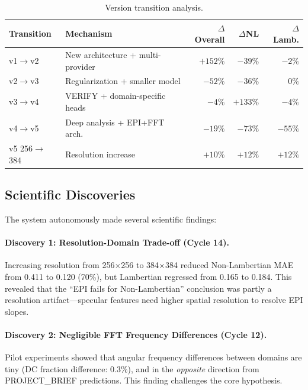 \documentclass[11pt,a4paper]{article}
\begin{document}
\begin{table}[h]
\centering
\begin{threeparttable}
\caption{Version transition analysis.}
\label{tab:transitions}
\begin{tabularx}{\linewidth}{l X r r r}
\toprule
\textbf{Transition} & \textbf{Mechanism} & $\Delta$\textbf{Overall} & $\Delta$\textbf{NL} & $\Delta$\textbf{Lamb.} \\
\midrule
v1$\to$v2 & New architecture + multi-provider & $+152\%$ & $-39\%$ & $-2\%$ \\
v2$\to$v3 & Regularization + smaller model & $-52\%$ & $-36\%$ & $0\%$ \\
v3$\to$v4 & VERIFY + domain-specific heads & $-4\%$ & $+133\%$ & $-4\%$ \\
v4$\to$v5 & Deep analysis + EPI+FFT arch. & $-19\%$ & $-73\%$ & $-55\%$ \\
v5 256$\to$384 & Resolution increase & $+10\%$ & $+12\%$ & $+12\%$ \\
\bottomrule
\end{tabularx}
\end{threeparttable}
\end{table}

\subsection{Scientific Discoveries}

The system autonomously made several scientific findings:

\paragraph{Discovery 1: Resolution-Domain Trade-off (Cycle 14).}
Increasing resolution from 256$\times$256 to 384$\times$384 reduced Non-Lambertian MAE from 0.411 to 0.120 (70\%), but Lambertian regressed from 0.165 to 0.184.
This revealed that the ``EPI fails for Non-Lambertian'' conclusion was partly a resolution artifact---specular features need higher spatial resolution to resolve EPI slopes.

\paragraph{Discovery 2: Negligible FFT Frequency Differences (Cycle 12).}
Pilot experiments showed that angular frequency differences between domains are tiny (DC fraction difference: 0.3\%), and in the \emph{opposite} direction from PROJECT\_BRIEF predictions.
This finding challenges the core hypothesis.
\end{document}
